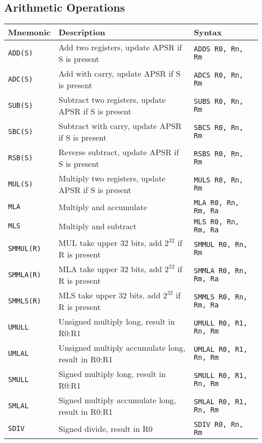 \documentclass[a4paper,12pt,openany]{book}
\begin{document}
\subsection{Arithmetic Operations}
\begin{table}[H]
    \centering
    \begin{tabular}{@{}lll@{}}
        \toprule
        Mnemonic & Description & Syntax \\
        \midrule
        \texttt{ADD(S)} & Add two registers, update APSR if S is present & \texttt{ADDS R0, Rn, Rm} \\
        \texttt{ADC(S)} & Add with carry, update APSR if S is present & \texttt{ADCS R0, Rn, Rm} \\
        \texttt{SUB(S)} & Subtract two registers, update APSR if S is present & \texttt{SUBS R0, Rn, Rm} \\
        \texttt{SBC(S)} & Subtract with carry, update APSR if S is present & \texttt{SBCS R0, Rn, Rm} \\
        \texttt{RSB(S)} & Reverse subtract, update APSR if S is present & \texttt{RSBS R0, Rn, Rm} \\
        \texttt{MUL(S)} & Multiply two registers, update APSR if S is present & \texttt{MULS R0, Rn, Rm} \\
        \texttt{MLA} & Multiply and accumulate& \texttt{MLA R0, Rn, Rm, Ra} \\
        \texttt{MLS} & Multiply and subtract& \texttt{MLS R0, Rn, Rm, Ra} \\
        \texttt{SMMUL(R)} & MUL take upper 32 bits, add $2^{32}$ if R is present& \texttt{SMMUL R0, Rn, Rm}\\
        \texttt{SMMLA(R)} & MLA take upper 32 bits, add $2^{32}$ if R is present& \texttt{SMMLA R0, Rn, Rm, Ra} \\
        \texttt{SMMLS(R)} & MLS take upper 32 bits, add $2^{32}$ if R is present& \texttt{SMMLS R0, Rn, Rm, Ra} \\
        \texttt{UMULL} & Unsigned multiply long, result in R0:R1 & \texttt{UMULL R0, R1, Rn, Rm} \\
        \texttt{UMLAL} & Unsigned multiply accumulate long, result in R0:R1 & \texttt{UMLAL R0, R1, Rn, Rm} \\
        \texttt{SMULL} & Signed multiply long, result in R0:R1 & \texttt{SMULL R0, R1, Rn, Rm} \\
        \texttt{SMLAL} & Signed multiply accumulate long, result in R0:R1 & \texttt{SMLAL R0, R1, Rn, Rm} \\
        \texttt{SDIV} & Signed divide, result in R0 & \texttt{SDIV R0, Rn, Rm} \\

\end{tabular}
\end{table}
\end{document}
